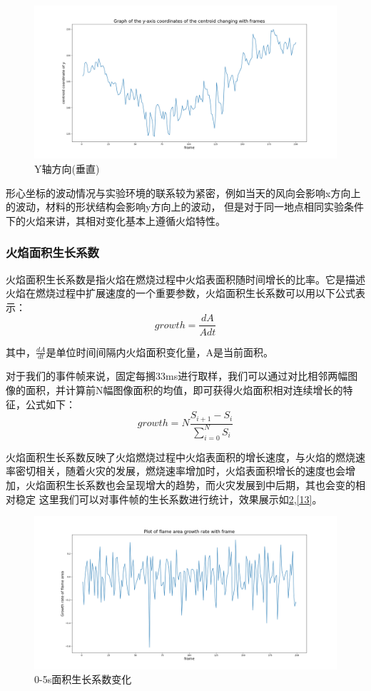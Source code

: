 \begin{figure}[ht]
    \centering
    \includegraphics[width=\textwidth]{figures/extract_centroid_y.png}
    \caption{Y轴方向(垂直)}
    \label{11}
\end{figure}

形心坐标的波动情况与实验环境的联系较为紧密，例如当天的风向会影响x方向上的波动，材料的形状结构会影响y方向上的波动，
但是对于同一地点相同实验条件下的火焰来讲，其相对变化基本上遵循火焰特性。

\subsubsection{火焰面积生长系数}
火焰面积生长系数是指火焰在燃烧过程中火焰表面积随时间增长的比率。它是描述火焰在燃烧过程中扩展速度的一个重要参数，火焰面积生长系数可以用以下公式表示：
\begin{equation} 
    growth=\frac{dA}{Adt}
\end{equation}

其中，$\frac{dA}{dt}$是单位时间间隔内火焰面积变化量，A是当前面积。

对于我们的事件帧来说，固定每搁33ms进行取样，我们可以通过对比相邻两幅图像的面积，并计算前N幅图像面积的均值，即可获得火焰面积相对连续增长的特征，公式如下：
\begin{equation} 
    growth=N\frac{S_{i+1}-S_i}{\sum_{i=0}^{N}S_i}
\end{equation}

火焰面积生长系数反映了火焰燃烧过程中火焰表面积的增长速度，与火焰的燃烧速率密切相关，随着火灾的发展，燃烧速率增加时，火焰表面积增长的速度也会增加，火焰面积生长系数也会呈现增大的趋势，而火灾发展到中后期，其也会变的相对稳定
这里我们可以对事件帧的生长系数进行统计，效果展示如\ref{12},\ref{13}。
\begin{figure}[ht]
    \centering
    \includegraphics[width=\textwidth]{figures/extract_area_01.png}
    \caption{0-5s面积生长系数变化}
    \label{12}
\end{figure}

